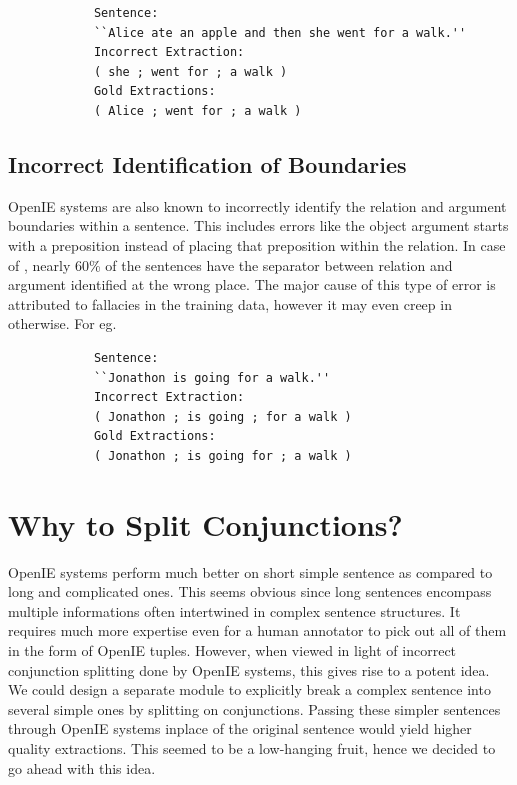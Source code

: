         \begin{verbatim}
            Sentence:
            ``Alice ate an apple and then she went for a walk.''
            Incorrect Extraction:
            ( she ; went for ; a walk )
            Gold Extractions:
            ( Alice ; went for ; a walk )
        \end{verbatim}

    \subsection{Incorrect Identification of Boundaries}

        OpenIE systems are also known to incorrectly identify the relation and argument boundaries within a sentence. This includes errors like the object argument starts with a preposition instead of placing that preposition within the relation. In case of \shortname, nearly 60\% of the sentences have the separator between relation and argument identified at the wrong place. The major cause of this type of error is attributed to fallacies in the training data, however it may even creep in otherwise. For eg.

        \begin{verbatim}
            Sentence:
            ``Jonathon is going for a walk.''
            Incorrect Extraction:
            ( Jonathon ; is going ; for a walk )
            Gold Extractions:
            ( Jonathon ; is going for ; a walk )
        \end{verbatim}

\section{Why to Split Conjunctions?}

    OpenIE systems perform much better on short simple sentence as compared to long and complicated ones. This seems obvious since long sentences encompass multiple informations often intertwined in complex sentence structures. It requires much more expertise even for a human annotator to pick out all of them in the form of OpenIE tuples. However, when viewed in light of incorrect conjunction splitting done by OpenIE systems, this gives rise to a potent idea. We could design a separate module to explicitly break a complex sentence into several simple ones by splitting on conjunctions. Passing these simpler sentences through OpenIE systems inplace of the original sentence would yield higher quality extractions. This seemed to be a low-hanging fruit, hence we decided to go ahead with this idea.

